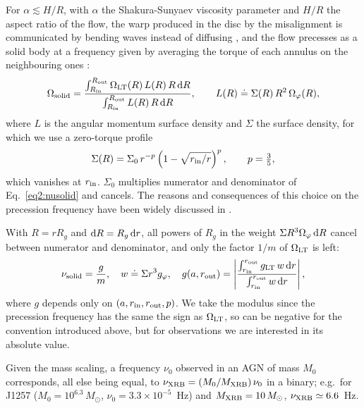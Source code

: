 For $\alpha \lesssim H/R$, with $\alpha$ the Shakura-Sunyaev viscosity parameter and $H/R$ the aspect ratio of the flow, the warp produced in the disc by the misalignment is communicated by bending waves instead of diffusing \citep{FoucartLai2014}, and the flow precesses as a solid body at a frequency given by averaging the torque of each annulus on the neighbouring ones \citep[see e.g.][]{Lodato_solid}:
\begin{equation}
    \label{eq2:nusolid}
    \Omega_\textup{solid} = \frac{\int_{R_\textup{in}}^{R_\textup{out}}\Omega_\textup{LT}(R) \, L(R) \, R \, \textup{d}R}{\int_{R_\textup{in}}^{R_\textup{out}} L(R) \, R \, \textup{d}R},
    \qquad L(R) \doteq \Sigma(R)\,R^2\,\Omega_\varphi(R),
\end{equation}
where $L$ is the angular momentum surface density and $\Sigma$ the surface density, for which we use a zero-torque profile
\begin{equation}
    \label{eq2:sigma}
    \Sigma(R)=\Sigma_0\,r^{-p}\left(1-\sqrt{r_\textup{in}/r}\right)^{p}, \qquad p=\tfrac35 ,
\end{equation}
which vanishes at $r_\textup{in}$.
$\Sigma_0$ multiplies numerator and denominator of Eq.~\eqref{eq2:nusolid} and cancels.
The reasons and consequences of this choice on the precession frequency have been widely discussed in \citet{Motta2017}.

With $R=rR_g$ and $\textup{d}R=R_g\,\textup{d}r$, all powers of $R_g$ in the weight $\Sigma R^3\Omega_\varphi\,\textup{d}R$ cancel between numerator and denominator, and only the factor $1/m$ of $\Omega_\textup{LT}$ is left:
\begin{equation}
    \label{eq2:gdef}
    \nu_\textup{solid}=\frac{g}{m},
    \quad
    w\doteq\Sigma r^3 g_\varphi ,
    \quad
    g(a,r_\textup{out})=\left|\frac{\int_{r_\textup{in}}^{r_\textup{out}} g_\textup{LT}\,w\,\textup{d}r}{\int_{r_\textup{in}}^{r_\textup{out}}w\,\textup{d}r}\right|,
\end{equation}
where $g$ depends only on $(a,r_\textup{in},r_\textup{out},p)$.
We take the modulus since the precession frequency has the same the sign as $\Omega_\textup{LT}$, so can be negative for the convention introduced above, but for observations we are interested in its absolute value.

Given the mass scaling, a frequency $\nu_0$ observed in an AGN of mass $M_0$ corresponds, all else being equal, to $\nu_\textup{XRB}=(M_0/M_\textup{XRB})\,\nu_0$ in a binary; 
e.g.\ for J1257 ($M_0=10^{6.3}\,M_\odot$, $\nu_0=3.3\times10^{-5}$~Hz) and $M_\textup{XRB}=10\,M_\odot$, $\nu_\textup{XRB}\simeq6.6$~Hz.


